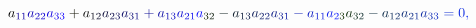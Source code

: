 \documentclass[12pt]{article}
\begin{document}
\begin{displaymath}
{a} _ { \mathcolor[RGB]{15,0,150}{1} \mathcolor[RGB]{15,0,165}{1} } \mathcolor[RGB]{15,0,180}{a} _ { \mathcolor[RGB]{15,0,195}{2} \mathcolor[RGB]{15,0,210}{2} } \mathcolor[RGB]{15,0,225}{a} _ { \mathcolor[RGB]{15,0,240}{3} \mathcolor[RGB]{15,0,255}{3} } \mathcolor[RGB]{15,15,0}{+} \mathcolor[RGB]{15,15,15}{a} _ { \mathcolor[RGB]{15,15,30}{1} \mathcolor[RGB]{15,15,45}{2} } \mathcolor[RGB]{15,15,60}{a} _ { \mathcolor[RGB]{15,15,75}{2} \mathcolor[RGB]{15,15,90}{3} } \mathcolor[RGB]{15,15,105}{a} _ { \mathcolor[RGB]{15,15,120}{3} \mathcolor[RGB]{15,15,135}{1} } \mathcolor[RGB]{15,15,150}{+} \mathcolor[RGB]{15,15,165}{a} _ { \mathcolor[RGB]{15,15,180}{1} \mathcolor[RGB]{15,15,195}{3} } \mathcolor[RGB]{15,15,210}{a} _ { \mathcolor[RGB]{15,15,225}{2} \mathcolor[RGB]{15,15,240}{1} } \mathcolor[RGB]{15,15,255}{a} _ { \mathcolor[RGB]{15,30,0}{3} \mathcolor[RGB]{15,30,15}{2} } \mathcolor[RGB]{15,30,30}{-} \mathcolor[RGB]{15,30,45}{a} _ { \mathcolor[RGB]{15,30,60}{1} \mathcolor[RGB]{15,30,75}{3} } \mathcolor[RGB]{15,30,90}{a} _ { \mathcolor[RGB]{15,30,105}{2} \mathcolor[RGB]{15,30,120}{2} } \mathcolor[RGB]{15,30,135}{a} _ { \mathcolor[RGB]{15,30,150}{3} \mathcolor[RGB]{15,30,165}{1} } \mathcolor[RGB]{15,30,180}{-} \mathcolor[RGB]{15,30,195}{a} _ { \mathcolor[RGB]{15,30,210}{1} \mathcolor[RGB]{15,30,225}{1} } \mathcolor[RGB]{15,30,240}{a} _ { \mathcolor[RGB]{15,30,255}{2} \mathcolor[RGB]{15,45,0}{3} } \mathcolor[RGB]{15,45,15}{a} _ { \mathcolor[RGB]{15,45,30}{3} \mathcolor[RGB]{15,45,45}{2} } \mathcolor[RGB]{15,45,60}{-} \mathcolor[RGB]{15,45,75}{a} _ { \mathcolor[RGB]{15,45,90}{1} \mathcolor[RGB]{15,45,105}{2} } \mathcolor[RGB]{15,45,120}{a} _ { \mathcolor[RGB]{15,45,135}{2} \mathcolor[RGB]{15,45,150}{1} } \mathcolor[RGB]{15,45,165}{a} _ { \mathcolor[RGB]{15,45,180}{3} \mathcolor[RGB]{15,45,195}{3} } \mathcolor[RGB]{15,45,210}{=} \mathcolor[RGB]{15,45,225}{0} \mathcolor[RGB]{15,45,240}{,} \mathcolor[RGB]{15,45,255}{\,
}
\end{displaymath}
\end{document}
